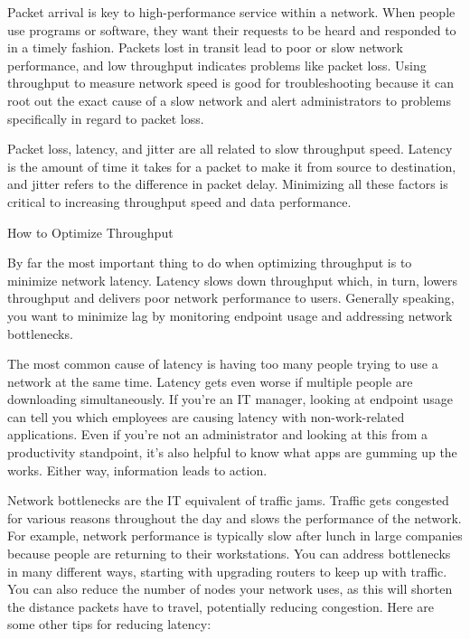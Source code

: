 Packet arrival is key to high-performance service within a network. When people use programs or software, they want their requests to be heard and responded to in a timely fashion. Packets lost in transit lead to poor or slow network performance, and low throughput indicates problems like packet loss. Using throughput to measure network speed is good for troubleshooting because it can root out the exact cause of a slow network and alert administrators to problems specifically in regard to packet loss.

Packet loss, latency, and jitter are all related to slow throughput speed. Latency is the amount of time it takes for a packet to make it from source to destination, and jitter refers to the difference in packet delay. Minimizing all these factors is critical to increasing throughput speed and data performance.

How to Optimize Throughput

By far the most important thing to do when optimizing throughput is to minimize network latency. Latency slows down throughput which, in turn, lowers throughput and delivers poor network performance to users. Generally speaking, you want to minimize lag by monitoring endpoint usage and addressing network bottlenecks.

The most common cause of latency is having too many people trying to use a network at the same time. Latency gets even worse if multiple people are downloading simultaneously. If you’re an IT manager, looking at endpoint usage can tell you which employees are causing latency with non-work-related applications. Even if you’re not an administrator and looking at this from a productivity standpoint, it’s also helpful to know what apps are gumming up the works. Either way, information leads to action.

Network bottlenecks are the IT equivalent of traffic jams. Traffic gets congested for various reasons throughout the day and slows the performance of the network. For example, network performance is typically slow after lunch in large companies because people are returning to their workstations. You can address bottlenecks in many different ways, starting with upgrading routers to keep up with traffic. You can also reduce the number of nodes your network uses, as this will shorten the distance packets have to travel, potentially reducing congestion.
Here are some other tips for reducing latency:

